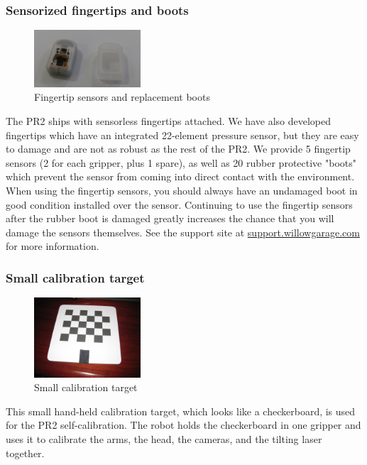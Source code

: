 \subsubsection{Sensorized fingertips and boots}
\begin{figure}[ht]
\centering
\includegraphics[width=150px]{images/fingertips.png}
\caption{Fingertip sensors and replacement boots}
\label{fig:fingertips}
\end{figure}
\label{fingertips}


The PR2 ships with sensorless
fingertips attached.  We have also developed fingertips which have an integrated
22-element pressure sensor, but they are easy to damage and are not as robust as
the rest of the PR2.  We provide 5 fingertip sensors (2 for each gripper, plus 1
spare), as well as 20 rubber protective "boots" which prevent the sensor from
coming into direct contact with the environment.  When using the fingertip
sensors, you should always have an undamaged boot in good condition installed
over the sensor.  Continuing to use the fingertip sensors after the rubber boot
is damaged greatly increases the chance that you will damage the sensors
themselves.  See the support site at \href{http://support.willowgarage.com}{support.willowgarage.com} for more information.

\subsubsection{Small calibration target}
\begin{figure}[ht]
\centering
\includegraphics[width=150px]{images/hand_checkerboard.png}
\caption{Small calibration target}
\label{fig:hand_checkerboard}
\end{figure}
\label{hand_checkerboard}

This small hand-held calibration target, which looks
like a checkerboard, is used for the PR2 self-calibration.  The robot holds the
checkerboard in one gripper and uses it to calibrate the arms, the head, the
cameras, and the tilting laser together.


